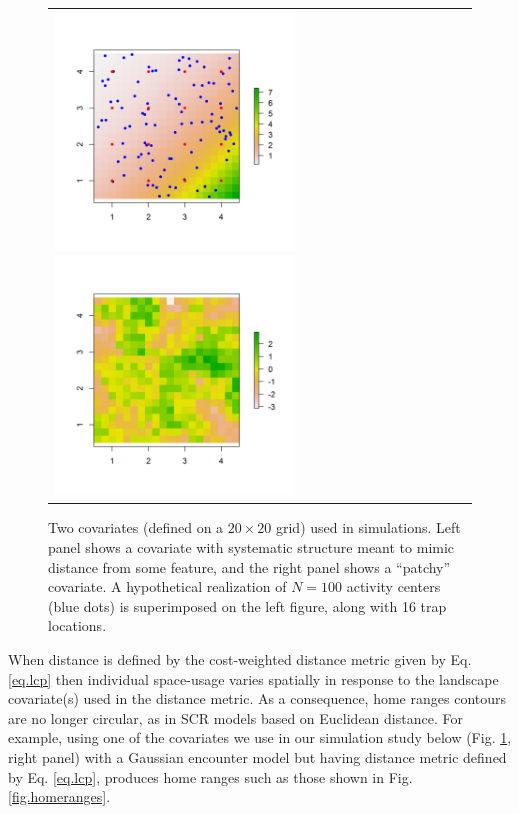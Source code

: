 \begin{figure}[h]
\begin{tabular}{ll}
\includegraphics[height=2.5in,width=2.5in]{Ch12-EcolDist/figs/raster_withN100}
\includegraphics[height=2.5in,width=2.5in]{Ch12-EcolDist/figs/raster_krige} &
\end{tabular}
\caption{Two covariates (defined on a $20 \times 20$ grid) used in simulations.
 Left panel shows a
 covariate with systematic structure meant
to mimic distance from some feature, and the right panel
 shows a ``patchy'' covariate.
A hypothetical
  realization of $N=100$ activity centers (blue dots) is superimposed
  on the left figure,
along with 16 trap locations. }
\label{ecoldist.fig.raster100}
\end{figure}


When distance is defined by the cost-weighted distance metric given
by Eq. \ref{eq.lcp} then individual space-usage varies
spatially in response to the landscape covariate(s) used in the
distance metric.  As a consequence, home ranges contours are no longer
circular, as in SCR models based on Euclidean distance.
 For example, using one of the covariates we use in
our simulation study below (Fig. \ref{ecoldist.fig.raster100}, right
panel) with a Gaussian
encounter model
but having distance
metric defined by Eq. \ref{eq.lcp}, produces home ranges such
as those shown in Fig. \ref{fig.homeranges}.


